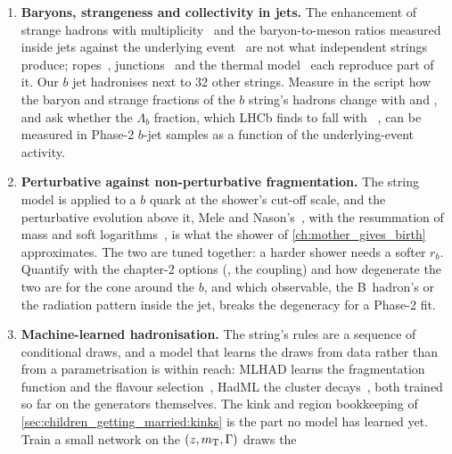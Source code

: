 \begin{enumerate}
    ,  and  measure how far
    the hadron-level cone around the $b$ moves for changes that leave the
    LEP mean unchanged; this is the model dependence a Phase-2 top mass of
    $0.2\GeV$ precision must either calibrate away or quote.
  \item \textbf{Baryons, strangeness and collectivity in jets.} The
    enhancement of strange hadrons with
    multiplicity~\cite{ALICE:2016fzo} and the baryon-to-meson ratios
    measured inside jets against the underlying event~\cite{ALICE:2022ecr}
    are not what independent strings produce; ropes~\cite{Bierlich:2014xba},
    junctions~\cite{Christiansen:2015yqa,Sjostrand:2002ip} and the thermal
    model~\cite{Fischer:2016zzs} each reproduce part of it. Our $b$ jet
    hadronises next to 32 other strings. Measure in the script how the
    baryon and strange fractions of the $b$ string's hadrons change with
     and , and ask whether the $\Lambda_b$
    fraction, which LHCb finds to fall with \pt~\cite{LHCb:2019fns}, can
    be measured in Phase-2 $b$-jet samples as a function of the
    underlying-event activity.
  \item \textbf{Perturbative against non-perturbative fragmentation.} The
    string model is applied to a $b$ quark at the shower's cut-off scale,
    and the perturbative evolution above it, Mele and
    Nason's~\cite{Mele:1990cw,Cacciari:2005uk}, with the resummation of
    mass and soft logarithms~\cite{Ghira:2023bxr}, is what the shower of
    \cref{ch:mother_gives_birth} approximates. The two are tuned together:
    a harder shower needs a softer $r_b$. Quantify with the chapter-2
    options (, the coupling) and  how
    degenerate the two are for the cone around the $b$, and which
    observable, the B~hadron's \xE or the radiation pattern inside the
    jet, breaks the degeneracy for a Phase-2 fit.
  \item \textbf{Machine-learned hadronisation.} The string's rules are a
    sequence of conditional draws, and a model that learns the draws from
    data rather than from a parametrisation is within reach: MLHAD learns
    the fragmentation function and the flavour selection~\cite{Ilten:2022jfm,Bierlich:2023zzd},
    HadML the cluster decays~\cite{Ghosh:2022zdz}, both trained so far on
    the generators themselves. The kink and region bookkeeping of
    \cref{sec:children_getting_married:kinks} is the part no model has
    learned yet. Train a small network on the $(z,m_{\mathrm{T}},\Gamma)$ draws the

\end{enumerate}
